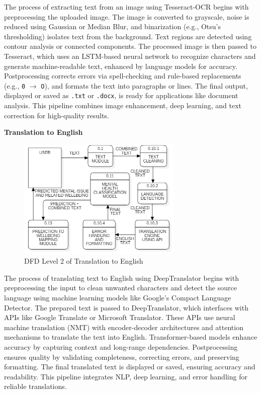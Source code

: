 \noindent
The process of extracting text from an image using Tesseract-OCR begins with preprocessing the uploaded image. The image is converted to grayscale, noise is reduced using Gaussian or Median Blur, and binarization (e.g., Otsu’s thresholding) isolates text from the background. Text regions are detected using contour analysis or connected components. The processed image is then passed to Tesseract, which uses an LSTM-based neural network to recognize characters and generate machine-readable text, enhanced by language models for accuracy. Postprocessing corrects errors via spell-checking and rule-based replacements (e.g., \texttt{0} $\rightarrow$ \texttt{O}), and formats the text into paragraphs or lines. The final output, displayed or saved as \texttt{.txt} or \texttt{.docx}, is ready for applications like document analysis. This pipeline combines image enhancement, deep learning, and text correction for high-quality results.

\vspace{2em}

\noindent
\textbf{Translation to English}

\begin{figure}[h!]  
    \centering
    \includegraphics[width=0.7\textwidth]{Images/DFD L2 TE.png}  
    \caption*{DFD Level 2 of Translation to English}
    \label{dfdl111}  %
\end{figure}

\noindent
The process of translating text to English using DeepTranslator begins with preprocessing the input to clean unwanted characters and detect the source language using machine learning models like Google’s Compact Language Detector. The prepared text is passed to DeepTranslator, which interfaces with APIs like Google Translate or Microsoft Translator. These APIs use neural machine translation (NMT) with encoder-decoder architectures and attention mechanisms to translate the text into English. Transformer-based models enhance accuracy by capturing context and long-range dependencies. Postprocessing ensures quality by validating completeness, correcting errors, and preserving formatting. The final translated text is displayed or saved, ensuring accuracy and readability. This pipeline integrates NLP, deep learning, and error handling for reliable translations.

